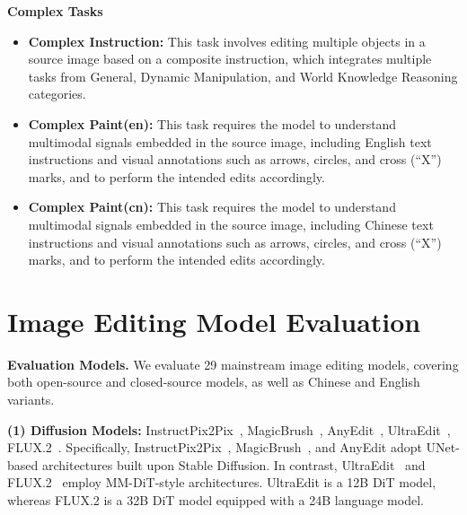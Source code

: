 \documentclass{llmxive}
\begin{document}
\textbf{Complex Tasks}
\begin{itemize}[leftmargin=2.2em, labelsep=0.4em, itemsep=2pt]
    \item \textbf{Complex Instruction:}  This task involves editing multiple objects in a source image based on a composite instruction, which integrates multiple tasks from General, Dynamic Manipulation, and World Knowledge Reasoning categories.
    \item \textbf{Complex Paint(en):} This task requires the model to understand multimodal signals embedded in the source image, including English text instructions and visual annotations such as arrows, circles, and cross (“X”) marks, and to perform the intended edits accordingly.
    \item \textbf{Complex Paint(cn):} This task requires the model to understand multimodal signals embedded in the source image, including Chinese text instructions and visual annotations such as arrows, circles, and cross (“X”) marks, and to perform the intended edits accordingly.
\end{itemize}

\section{Image Editing Model Evaluation}
\label{supp:Evaluation Details}
\textbf{Evaluation Models.}  We evaluate 29 mainstream image editing models, covering both open-source and closed-source models, as well as Chinese and English variants.

\hspace*{1em} \noindent\textbf{(1) Diffusion Models:} InstructPix2Pix~\cite{brooks2023instructpix2pix}, MagicBrush~\cite{zhang2023magicbrush}, AnyEdit~\cite{yu2025anyedit}, UltraEdit~\cite{zhao2024ultraedit}, FLUX.2~\cite{flux-2-2025}. Specifically, InstructPix2Pix~\cite{brooks2023instructpix2pix}, MagicBrush~\cite{zhang2023magicbrush}, and AnyEdit adopt UNet-based architectures built upon Stable Diffusion. In contrast, UltraEdit~\cite{zhao2024ultraedit} and FLUX.2~\cite{flux-2-2025} employ MM-DiT-style architectures. UltraEdit is a 12B DiT model, whereas FLUX.2 is a 32B DiT model equipped with a 24B language model.
\end{document}
